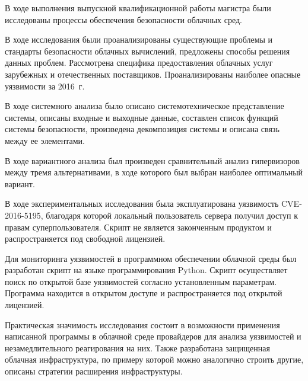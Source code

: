 
В ходе выполнения выпускной квалификационной работы магистра были исследованы процессы обеспечения безопасности облачных сред.

В ходе исследования были проанализированы существующие проблемы и стандарты безопасности облачных вычислений, предложены способы решения данных проблем.
Рассмотрена специфика предоставления облачных услуг зарубежных и отечественных поставщиков.
Проанализированы наиболее опасные уязвимости за 2016~г.

В ходе системного анализа было описано системотехническое представление системы, описаны входные и выходные данные, составлен список функций системы безопасности, произведена декомпозиция системы и описана связь между ее элементами.

В ходе вариантного анализа был произведен сравнительный анализ гипервизоров между тремя альтернативами, в ходе которого был выбран наиболее оптимальный вариант.

В ходе экспериментальных исследования была эксплуатирована уязвимость CVE-2016-5195, благодаря которой локальный пользователь сервера получил доступ к правам суперпользователя.
Скрипт не является законченным продуктом и распространяется под свободной лицензией.

Для мониторинга уязвимостей в программном обеспечении облачной среды был разработан скрипт на языке программирования Python.
Скрипт осуществляет поиск по открытой базе уязвимостей согласно установленным параметрам.
Программа находится в открытом доступе и распространяется под открытой лицензией.

Практическая значимость исследования состоит в возможности применения написанной программы в облачной среде провайдеров для анализа уязвимостей и незамедлительного реагирования на них.
Также разработана защищенная облачная инфраструктура, по примеру которой можно аналогично строить другие, описаны стратегии расширения инфраструктуры.

\clearpage
